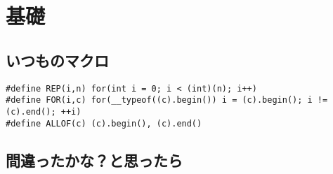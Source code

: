 \setcounter{section}{-1}

\section{基礎}

\subsection{いつものマクロ}

\begin{lstlisting}
#define REP(i,n) for(int i = 0; i < (int)(n); i++)
#define FOR(i,c) for(__typeof((c).begin()) i = (c).begin(); i != (c).end(); ++i)
#define ALLOF(c) (c).begin(), (c).end()
\end{lstlisting}


\subsection{間違ったかな？と思ったら}

